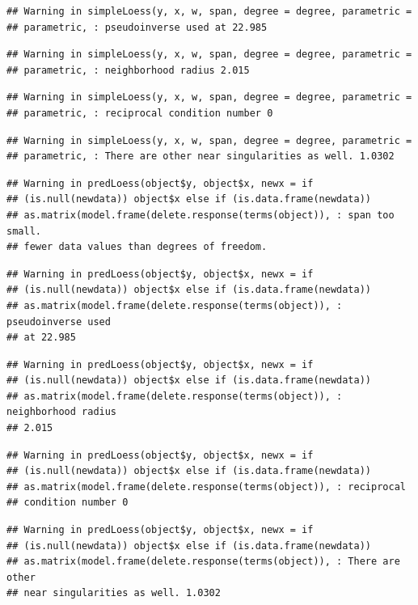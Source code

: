\documentclass[]{book}
\theoremstyle{definition}
\theoremstyle{definition}
\theoremstyle{definition}
\theoremstyle{remark}
\begin{document}
\begin{enumerate}
\begin{verbatim}
## Warning in simpleLoess(y, x, w, span, degree = degree, parametric =
## parametric, : pseudoinverse used at 22.985
\end{verbatim}

\begin{verbatim}
## Warning in simpleLoess(y, x, w, span, degree = degree, parametric =
## parametric, : neighborhood radius 2.015
\end{verbatim}

\begin{verbatim}
## Warning in simpleLoess(y, x, w, span, degree = degree, parametric =
## parametric, : reciprocal condition number 0
\end{verbatim}

\begin{verbatim}
## Warning in simpleLoess(y, x, w, span, degree = degree, parametric =
## parametric, : There are other near singularities as well. 1.0302
\end{verbatim}

\begin{verbatim}
## Warning in predLoess(object$y, object$x, newx = if
## (is.null(newdata)) object$x else if (is.data.frame(newdata))
## as.matrix(model.frame(delete.response(terms(object)), : span too small.
## fewer data values than degrees of freedom.
\end{verbatim}

\begin{verbatim}
## Warning in predLoess(object$y, object$x, newx = if
## (is.null(newdata)) object$x else if (is.data.frame(newdata))
## as.matrix(model.frame(delete.response(terms(object)), : pseudoinverse used
## at 22.985
\end{verbatim}

\begin{verbatim}
## Warning in predLoess(object$y, object$x, newx = if
## (is.null(newdata)) object$x else if (is.data.frame(newdata))
## as.matrix(model.frame(delete.response(terms(object)), : neighborhood radius
## 2.015
\end{verbatim}

\begin{verbatim}
## Warning in predLoess(object$y, object$x, newx = if
## (is.null(newdata)) object$x else if (is.data.frame(newdata))
## as.matrix(model.frame(delete.response(terms(object)), : reciprocal
## condition number 0
\end{verbatim}

\begin{verbatim}
## Warning in predLoess(object$y, object$x, newx = if
## (is.null(newdata)) object$x else if (is.data.frame(newdata))
## as.matrix(model.frame(delete.response(terms(object)), : There are other
## near singularities as well. 1.0302
\end{verbatim}


\end{enumerate}
\end{document}
